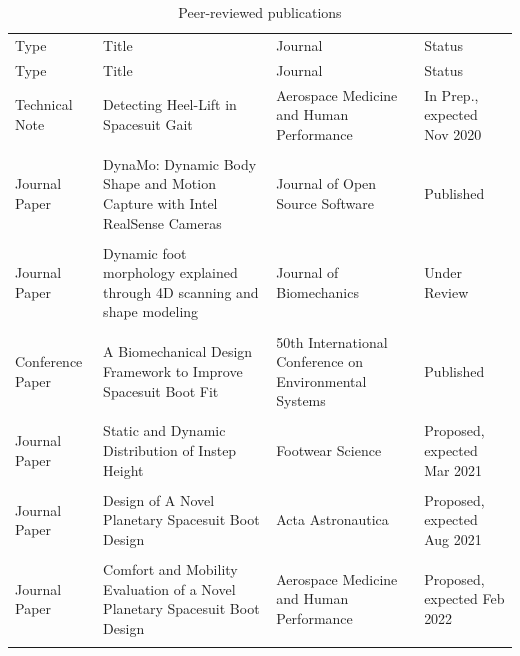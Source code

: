 \documentclass[defaultstyle,11pt]{comps}
\begin{document}
\pagebreak

\hypertarget{tbl:pubs}{}
\begin{longtable}[]{@{}
  >{\raggedright\arraybackslash}p{}
  >{\raggedright\arraybackslash}p{}
  >{\raggedright\arraybackslash}p{}
  >{\raggedright\arraybackslash}p{}@{}}
\caption{\label{tbl:pubs}Peer-reviewed publications}\tabularnewline
\toprule
Type & Title & Journal & Status \\ \addlinespace
\midrule
\endfirsthead
\toprule
Type & Title & Journal & Status \\ \addlinespace
\midrule
\endhead
Technical Note & Detecting Heel-Lift in Spacesuit Gait & Aerospace Medicine and Human Performance & In Prep., expected Nov 2020 \\ \addlinespace
& & & \\ \addlinespace
Journal Paper & DynaMo: Dynamic Body Shape and Motion Capture with Intel RealSense Cameras & Journal of Open Source Software & Published \\ \addlinespace
& & & \\ \addlinespace
Journal Paper & Dynamic foot morphology explained through 4D scanning and shape modeling & Journal of Biomechanics & Under Review \\ \addlinespace
& & & \\ \addlinespace
Conference Paper & A Biomechanical Design Framework to Improve Spacesuit Boot Fit & 50th International Conference on Environmental Systems & Published \\ \addlinespace
& & & \\ \addlinespace
Journal Paper & Static and Dynamic Distribution of Instep Height & Footwear Science & Proposed, expected Mar 2021 \\ \addlinespace
& & & \\ \addlinespace
Journal Paper & Design of A Novel Planetary Spacesuit Boot Design & Acta Astronautica & Proposed, expected Aug 2021 \\ \addlinespace
& & & \\ \addlinespace
Journal Paper & Comfort and Mobility Evaluation of a Novel Planetary Spacesuit Boot Design & Aerospace Medicine and Human Performance & Proposed, expected Feb 2022 \\ \addlinespace
\bottomrule
\end{longtable}

\pagebreak
\end{document}
